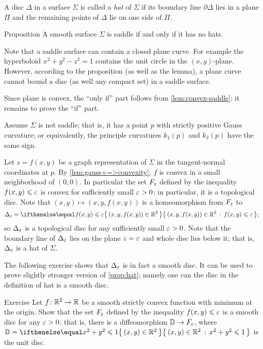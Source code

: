 A disc $\Delta$ in a surface $\Sigma$ is called a \emph{hat} of $\Sigma$
if its boundary line $\partial\Delta$ lies in a plane $\Pi$ and the remaining points of $\Delta$ lie on one side of $\Pi$.

\begin{thm}{Proposition}\label{prop:hat}
A smooth surface $\Sigma$ is saddle if and only if it has no hats.
\end{thm}

Note that a saddle surface can contain a closed plane curve.
For example the hyperboloid $x^2+y^2-z^2=1$ contains the unit circle in the $(x,y)$-plane.
However, according to the proposition (as well as the lemma), a plane curve cannot bound a disc (as well any compact set) in a saddle surface.

Since plane is convex, the ``only if'' part follows from \ref{lem:convex-saddle};
it remains to prove the ``if'' part.

Assume $\Sigma$ is not saddle; that is, it has a point $p$ with strictly positive Gauss curvature;
or equivalently, the principle curvatures $k_1(p)$ and $k_2(p)$ have the same sign.


Let $z=f(x,y)$ be a graph representation of $\Sigma$ in the tangent-normal coordinates at $p$.
By \ref{lem:gauss+=>convexity}, $f$ is convex in a small neighborhood of $(0,0)$.
In particular the set $F_\varepsilon$ defined by the inequality $f(x,y)\leqslant \varepsilon$ is convex for sufficiently small $\varepsilon>0$;
in particular, it is a topological disc.
Note that $(x,y)\mapsto (x,y,f(x,y))$ is a homeomorphism from $F_\varepsilon$
to
\[\Delta_\eps=\set{(x,y,f(x,y))\in \RR^3}{f(x,y)\le \eps};\]
so $\Delta_\varepsilon$ is a topological disc for any sufficiently small $\varepsilon>0$.
Note that the boundary line of $\Delta_\varepsilon$ lies on the plane $z=\varepsilon$ and whole disc lies below it;
that is, $\Delta_\varepsilon$ is a hat of $\Sigma$.
\qeds

The following exercise shows that $\Delta_\varepsilon$ is in fact a smooth disc.
It can be used to prove slightly stronger version of \ref{prop:hat};
namely one can the disc in the definition of hat is a smooth disc.

\begin{thm}{Exercise}\label{ex:disc-hat}
Let $f\colon\mathbb{R}^2\to\mathbb{R}$ be a smooth strictly convex function with minimum at the origin.
Show that the set $F_\varepsilon$ defined by the inequality $f(x,y)\leqslant \varepsilon$ is a smooth disc for any $\varepsilon>0$;
that is, there is a diffeomorphism %
$\mathbb{D}\to F_\varepsilon$, where $\DD=\set{(x,y)\in\RR^2}{x^2+y^2\le 1}$ is the unit disc.
\end{thm}


